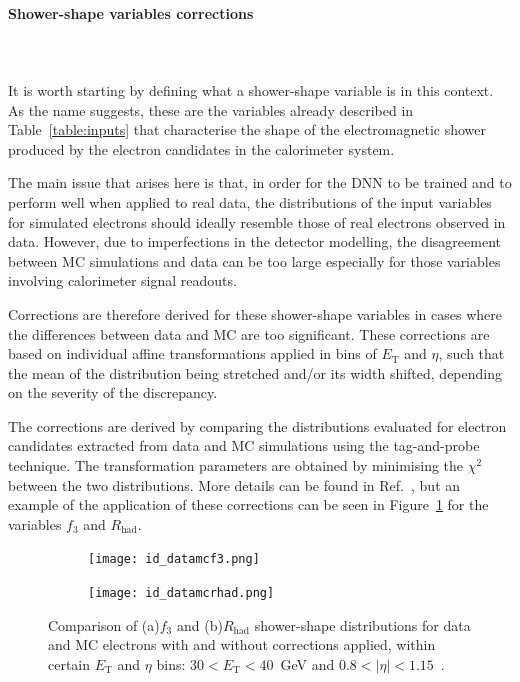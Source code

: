 \paragraph{Shower-shape variables corrections} \mbox{}\\
\\
It is worth starting by defining what a shower-shape variable is in this context. As the name suggests, these are the variables already described in Table~\ref{table:inputs} that characterise the shape of the electromagnetic shower produced by the electron candidates in the calorimeter system.

The main issue that arises here is that, in order for the DNN to be trained and to perform well when applied to real data, the distributions of the input variables for simulated electrons should ideally resemble those of real electrons observed in data. However, due to imperfections in the detector modelling, the disagreement between MC simulations and data can be too large especially for those variables involving calorimeter signal readouts. %

Corrections are therefore derived for these shower-shape variables in cases where the differences between data and MC are too significant. These corrections are based on individual affine transformations applied in bins of $E_{\text{T}}$ and $\eta$, such that the mean of the distribution being stretched and/or its width shifted, depending on the severity of the discrepancy.

The corrections are derived by comparing the distributions evaluated for \zee electron candidates extracted from data and MC simulations using the tag-and-probe technique. The transformation parameters are obtained by minimising the $\chi^2$ between the two distributions. More details can be found in Ref.~\cite{Aaboud:2657964}, but an example of the application of these corrections can be seen in Figure~\ref{fig:corrected} for the variables $f_{3}$ and $R_{\text{had}}$.


\begin{figure}[htbp]
  \centering
  \begin{subfigure}[b]{0.48\textwidth}
      \texttt{[image: id\_datamcf3.png]}
      \caption{}
  \end{subfigure}
  \hfill
  \begin{subfigure}[b]{0.48\textwidth}
      \texttt{[image: id\_datamcrhad.png]}
      \caption{}
  \end{subfigure}
  \hfill
  \caption{Comparison of (a)$f_{3}$ and (b)$R_{\text{had}}$ shower-shape distributions for data and MC electrons with and without corrections applied, within certain $E_{\text{T}}$ and $\eta$ bins: $30 < E_{\text{T}} < 40$~GeV and $0.8<|\eta|<1.15$~\cite{Aaboud:2657964}.}
  \label{fig:corrected}
\end{figure}

